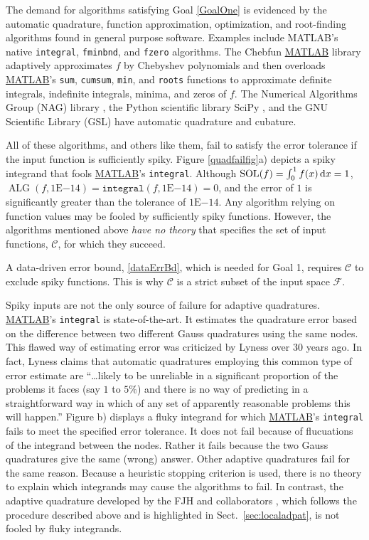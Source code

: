 \documentclass[11pt]{NSFamsart}
\newcommand{\MATLAB}{\hyperlink{MATLABlink}{MATLAB}\xspace}
\DeclareMathOperator{\SOL}{SOL}
\DeclareMathOperator{\ALG}{ALG}
\def\dif{\textup{d}}
\newcommand{\calc}{{\mathcal{C}}}
\newcommand{\calf}{{\mathcal{F}}}
\begin{document}
The demand for algorithms satisfying Goal \ref{GoalOne} is evidenced by the automatic quadrature, function approximation, optimization, and root-finding algorithms found in general purpose software.  Examples include \hypertarget{MATLABlink}{MATLAB}'s \cite{MAT9.5} native \texttt{integral}, \texttt{fminbnd}, and \texttt{fzero} algorithms.  The \hypertarget{Chebfunlink}{Chebfun} \cite{TrefEtal17a} \MATLAB library adaptively approximates $f$ by Chebyshev polynomials and then overloads \MATLAB's \texttt{sum}, \texttt{cumsum}, \texttt{min}, and \texttt{roots} functions to approximate definite integrals, indefinite integrals, minima, and zeros of $f$.  The  Numerical Algorithms Group
(\hypertarget{NAGlink}{NAG}) library \citep{NAG23}, the Python scientific library \hypertarget{SciPylink}{SciPy} \cite{SCIPY}, and the GNU Scientific Library (\hypertarget{GSLlink}{GSL}) \cite{GSL} have automatic quadrature and cubature. 

All of these algorithms, and others like them, fail to satisfy the error tolerance if the input function is sufficiently spiky.  Figure \ref{quadfailfig}a) depicts a spiky integrand that fools \MATLAB's \texttt{integral}.  Although $\SOL(f) = \int_0^1 f(x) \, \dif x = 1$, $\ALG(f,1\text{E}{-14}) = \texttt{integral}(f,1\text{E}{-14}) = 0$, and the error of $1$ is significantly greater than the tolerance of $1\text{E}{-14}$.  Any algorithm relying on function values may be fooled by sufficiently spiky functions.  However, the algorithms mentioned above \emph{have no theory} that specifies the set of input functions, $\calc$, for which they succeed.

A data-driven error bound, \eqref{dataErrBd}, which is needed for Goal 1, requires $\calc$ to exclude spiky functions.  This is why $\calc$ is a strict subset of the input space $\calf$.

Spiky inputs are not the only source of failure for adaptive quadratures. 
\MATLAB's
\texttt{integral} \cite{Sha08a, MAT9.5} is state-of-the-art.  It estimates the quadrature error based on the difference between two different Gauss quadratures using the same nodes. This flawed way of estimating error was criticized by 
Lyness \cite[p.\ 69]{Lyn83} over 30 years ago.  In fact, Lyness claims that automatic quadratures employing this common type of error estimate are ``\ldots likely to be unreliable in a significant proportion of the problems it faces 
	(say $1$ to $5\%$) and there is no way of predicting in a straightforward way in which of any set
	of apparently reasonable problems this will happen.''
Figure \label{quadfailfig}b) displays a fluky integrand for which \MATLAB's \texttt{integral} fails to meet the specified error tolerance.  It does not fail because of flucuations of the integrand between the nodes.  Rather it fails because the two Gauss quadratures give the same (wrong) answer.  Other adaptive quadratures fail for the same reason.  Because a heuristic stopping criterion is used, there is no theory to explain which integrands may cause the algorithms to fail.  In contrast, the adaptive quadrature developed by the FJH and collaborators \cite{HicEtal14b, Zha18a}, which follows the procedure described above and is highlighted in Sect.\ \ref{sec:localadpat}, is not fooled by fluky integrands.
\end{document}
